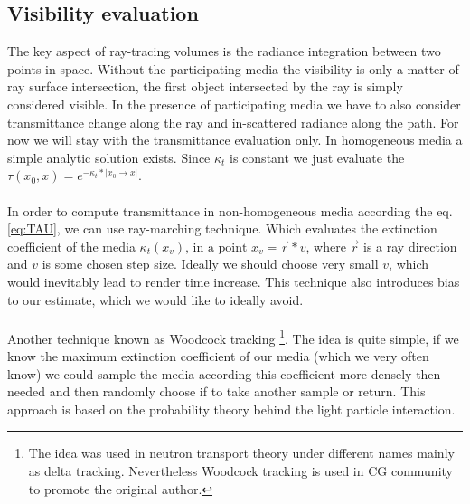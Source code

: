 
\subsection{Visibility evaluation}
The key aspect of ray-tracing volumes is the radiance integration between two points in space. Without the participating media the visibility is only a matter of ray surface intersection, the first object intersected by the ray is simply considered visible. In the presence of participating media we have to also consider transmittance change along the ray and in-scattered radiance along the path. For now we will stay with the transmittance evaluation only. In homogeneous media a simple analytic solution exists. Since $\kappa_t$ is constant we just evaluate the $  \tau(x_{0},x)=e^{-\kappa_t*\left | x_{0}\rightarrow x \right |}$.
\\
\\
In order to compute transmittance in non-homogeneous media according the eq. \ref{eq:TAU}, we can use ray-marching technique. Which evaluates the extinction coefficient of the media $\kappa_t(x_{v})\text{, in a point }x_{v}=\vec{r}*v$, where $\vec{r}$ is a ray direction and $v$ is some chosen step size. Ideally we should choose very small $v$, which would inevitably lead to render time increase. This technique also introduces bias to our estimate, which we would like to ideally avoid.
\\
\\
Another technique known as Woodcock tracking \footnote{ The idea was used in neutron transport theory under different names mainly as delta tracking. Nevertheless Woodcock tracking is used in CG community to promote the original author.}. The idea is quite simple, if we know the maximum extinction coefficient of our media (which we very often know) we could sample the media according this coefficient more densely then needed and then randomly choose if to take another sample or return. This approach is based on the probability theory behind the light particle interaction.

